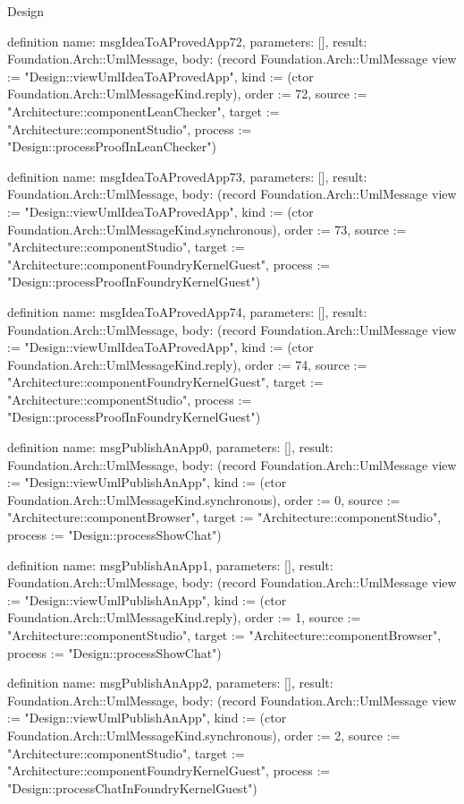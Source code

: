 \begin{lexlean}{Design}
\begin{semanticmodule}
definition{
  name: msgIdeaToAProvedApp72,
  parameters: [],
  result: Foundation.Arch::UmlMessage,
  body: (record Foundation.Arch::UmlMessage {view := "Design::viewUmlIdeaToAProvedApp", kind := (ctor Foundation.Arch::UmlMessageKind.reply), order := 72, source := "Architecture::componentLeanChecker", target := "Architecture::componentStudio", process := "Design::processProofInLeanChecker"})
}

definition{
  name: msgIdeaToAProvedApp73,
  parameters: [],
  result: Foundation.Arch::UmlMessage,
  body: (record Foundation.Arch::UmlMessage {view := "Design::viewUmlIdeaToAProvedApp", kind := (ctor Foundation.Arch::UmlMessageKind.synchronous), order := 73, source := "Architecture::componentStudio", target := "Architecture::componentFoundryKernelGuest", process := "Design::processProofInFoundryKernelGuest"})
}

definition{
  name: msgIdeaToAProvedApp74,
  parameters: [],
  result: Foundation.Arch::UmlMessage,
  body: (record Foundation.Arch::UmlMessage {view := "Design::viewUmlIdeaToAProvedApp", kind := (ctor Foundation.Arch::UmlMessageKind.reply), order := 74, source := "Architecture::componentFoundryKernelGuest", target := "Architecture::componentStudio", process := "Design::processProofInFoundryKernelGuest"})
}

definition{
  name: msgPublishAnApp0,
  parameters: [],
  result: Foundation.Arch::UmlMessage,
  body: (record Foundation.Arch::UmlMessage {view := "Design::viewUmlPublishAnApp", kind := (ctor Foundation.Arch::UmlMessageKind.synchronous), order := 0, source := "Architecture::componentBrowser", target := "Architecture::componentStudio", process := "Design::processShowChat"})
}

definition{
  name: msgPublishAnApp1,
  parameters: [],
  result: Foundation.Arch::UmlMessage,
  body: (record Foundation.Arch::UmlMessage {view := "Design::viewUmlPublishAnApp", kind := (ctor Foundation.Arch::UmlMessageKind.reply), order := 1, source := "Architecture::componentStudio", target := "Architecture::componentBrowser", process := "Design::processShowChat"})
}

definition{
  name: msgPublishAnApp2,
  parameters: [],
  result: Foundation.Arch::UmlMessage,
  body: (record Foundation.Arch::UmlMessage {view := "Design::viewUmlPublishAnApp", kind := (ctor Foundation.Arch::UmlMessageKind.synchronous), order := 2, source := "Architecture::componentStudio", target := "Architecture::componentFoundryKernelGuest", process := "Design::processChatInFoundryKernelGuest"})
}


\end{semanticmodule}
\end{lexlean}
